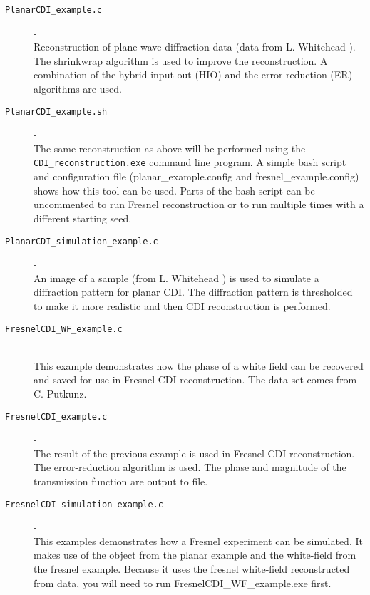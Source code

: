 \documentclass[]{nadia}
\begin{document}
\begin{description}

\item[{\tt PlanarCDI\_example.c}] - \\ Reconstruction of plane-wave diffraction
  data (data from L. Whitehead \cite{Whitehead:08}). The shrinkwrap algorithm is
  used to improve the reconstruction. A combination of the hybrid
  input-out (HIO) and the error-reduction (ER) algorithms are used.

\item[{\tt PlanarCDI\_example.sh}] - \\ The same reconstruction as
  above will be performed using the {\tt CDI\_reconstruction.exe}
  command line program. A simple bash script and configuration file
  (planar\_example.config and fresnel\_example.config) shows how this
  tool can be used. Parts of the bash script can be uncommented to run
  Fresnel reconstruction or to run multiple times with a different
  starting seed.

\item[{\tt PlanarCDI\_simulation\_example.c}] - \\ An image of a sample (from
  L. Whitehead \cite{}) is used to simulate a diffraction pattern for
  planar CDI. The diffraction pattern is thresholded to make it more
  realistic and then CDI reconstruction is performed.

\item[{\tt FresnelCDI\_WF\_example.c }] - \\ This example demonstrates
  how the phase of a white field can be recovered and saved for use in
  Fresnel CDI reconstruction. The data set comes from C. Putkunz.

\item[{\tt FresnelCDI\_example.c }]- \\ The result of the previous
  example is used in Fresnel CDI reconstruction. The error-reduction
  algorithm is used. The phase and magnitude of the transmission
  function are output to file.

\item[{\tt FresnelCDI\_simulation\_example.c }]- \\ This examples
  demonstrates how a Fresnel experiment can be simulated. It makes use
  of the object from the planar example and the white-field from the
  fresnel example. Because it uses the fresnel white-field
  reconstructed from data, you will need to run
  FresnelCDI\_WF\_example.exe first.


\end{description}
\end{document}
